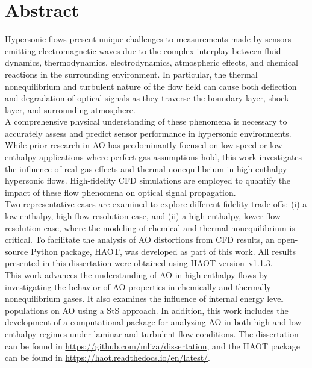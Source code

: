 \chapter*{Abstract}
Hypersonic flows present unique challenges to measurements made by sensors
emitting electromagnetic waves due to the complex interplay between fluid
dynamics, thermodynamics, electrodynamics, atmospheric effects, and chemical
reactions in the surrounding environment. In particular, the thermal
nonequilibrium and turbulent nature of the flow field can cause both deflection
and degradation of optical signals as they traverse the boundary layer, shock
layer, and surrounding atmosphere.\\

A comprehensive physical understanding of these phenomena is necessary to
accurately assess and predict sensor performance in hypersonic environments.
While prior research in \gls{AO} has predominantly focused on low-speed or
low-enthalpy applications where perfect gas assumptions hold, this work
investigates the influence of real gas effects and thermal nonequilibrium in
high-enthalpy hypersonic flows. High-fidelity \gls{CFD} simulations are
employed to quantify the impact of these flow phenomena on optical signal
propagation.\\

Two representative cases are examined to explore different fidelity trade-offs:
(i) a low-enthalpy, high-flow-resolution case, and (ii) a high-enthalpy,
lower-flow-resolution case, where the modeling of chemical and thermal
nonequilibrium is critical. To facilitate the analysis of \gls{AO} 
distortions from \gls{CFD} results, an open-source Python package, \gls{HAOT},
was developed as part of this work. All results presented in this dissertation
were obtained using \gls{HAOT} version~v1.1.3. \\

This work advances the understanding of \gls{AO} in high-enthalpy flows 
by investigating the behavior of \gls{AO} properties in chemically and
thermally nonequilibrium gases. It also examines the influence of internal
energy level populations on \gls{AO} using a \gls{StS} approach. In addition,
this work includes the development of a computational package for analyzing
\gls{AO} in both high and low-enthalpy regimes under laminar and turbulent
flow conditions. The dissertation can be found in
\href{https://github.com/mliza/dissertation}{https://github.com/mliza/dissertation}, and the \gls{HAOT} package can be found in \href{https://haot.readthedocs.io/en/latest/}{https://haot.readthedocs.io/en/latest/}.

\newpage
